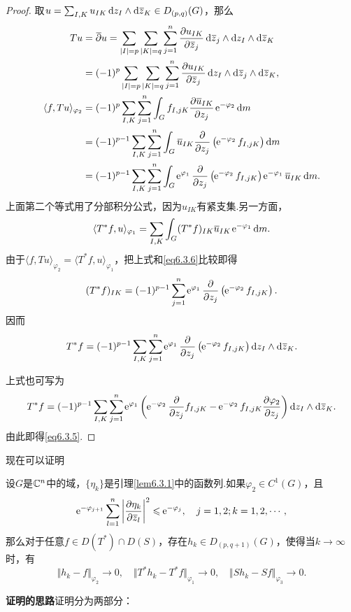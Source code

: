 \begin{proof}
	取$u=\sum_{I,K}u_{IK}\mathop{}\!\mathrm dz_I\wedge\mathop{}\!\mathrm d{}\mkern1mu\overline{\mkern-1muz}_K\in D_{(p,q)}(G)$，那么
	\begin{align}\label{eq6.3.6}
		Tu
		&=\bar{\partial}u=\sum_{|I|=p}\sum_{|K|=q}\sum_{j=1}^{n}\pp{u_{IK}}{\bar{z}_j}\dzz_j\wedge\dz_I\wedge\dzz_K\notag\\
		&=(-1)^p\sum_{|I|=p}\sum_{|K|=q}\sum_{j=1}^{n}\pp{u_{IK}}{\bar{z}_j}\dz_I\wedge\dzz_j\wedge\dzz_K,\notag\\
		\langle f,Tu\rangle_{\varphi_2}
		&=(-1)^p\sum_{I,K}\sum_{j=1}^n \int_G f_{I,jK}\pp{\bar{u}_{IK}}{z_j}\ee^{-\varphi_2}\dif m\notag\\
		&=(-1)^{p-1}\sum_{I,K}\sum_{j=1}^n \int_G\bar{u}_{IK}\pp{}{z_j}\left(\ee^{-\varphi_2}f_{I,jK}\right)\dif m\notag\\
		&=(-1)^{p-1}\sum_{I,K}\sum_{j=1}^n \int_G \ee^{\varphi_1}\pp{}{z_j}\left(\ee^{-\varphi_2}f_{I,jK}\right)\ee^{-\varphi_1}\bar{u}_{IK}\dif m.
	\end{align}
上面第二个等式用了分部积分公式，因为$u_{IK}$有紧支集.另一方面，
\[\langle T^\ast f,u\rangle_{\varphi_1}=\sum_{I,K}\int_G (T^\ast f)_{IK}{}\mkern1mu\overline{\mkern-1muu}_{IK}\operatorname{\!\!\;\mathrm e}^{-\varphi_1}\mathop{}\!\mathrm{d} m.\]
由于$\langle f,Tu\rangle_{\varphi_2}=\langle T^\ast f,u\rangle_{\varphi_1}$，把上式和\eqref{eq6.3.6}比较即得
\[(T^\ast f)_{IK}=(-1)^{p-1}\sum_{j=1}^{n}\operatorname{\!\!\;\mathrm e}^{\varphi_1}\frac{\partial }{\partial z_j}\left(\operatorname{\!\!\;\mathrm e}^{-\varphi_2}f_{I,jK}\right).\]
因而
\[T^\ast f=(-1)^{p-1}\sum_{I,K}\sum_{j=1}^{n}\operatorname{\!\!\;\mathrm e}^{\varphi_1}\frac{\partial }{\partial z_j}\left(\operatorname{\!\!\;\mathrm e}^{-\varphi_2}f_{I,jK}\right)\mathop{}\!\mathrm dz_I\wedge\mathop{}\!\mathrm d{}\mkern1mu\overline{\mkern-1muz}_K.\]

上式也可写为
\[T^\ast f=(-1)^{p-1}\sum_{I,K}\sum_{j=1}^{n}\ee^{\varphi_1}\left(\ee^{-\varphi_2}\pp{}{z_j}f_{I,jK}-\ee^{-\varphi_2}f_{I,jK}\pp{\varphi_2}{z_j}\right)\dz_I\wedge\dzz_K.\]
由此即得\eqref{eq6.3.5}.
\end{proof}
现在可以证明
\begin{prop}\label{prop6.3.4}
	设$G$是$\mathbb C^n$中的域，$\{\eta_k\}$是引理\ref{lem6.3.1}中的函数列.如果$\varphi_2\in C^1(G)$，且
	\begin{equation}\label{eq6.3.7}
		\operatorname{\!\!\;\mathrm e}^{-\varphi_{j+1}}\sum_{l=1}^{n}\left|\frac{\partial \eta_k}{\partial {}\mkern1mu\overline{\mkern-1muz}_l}\right|^2\leqslant\operatorname{\!\!\;\mathrm e}^{-\varphi_j},\quad j=1,2;k=1,2,\cdots,
	\end{equation}
那么对于任意$f\in D(T^\ast)\cap D(S)$，存在$h_k\in D_{(p,q+1)}(G)$，使得当$k\to\infty$时，有
\[\Vert h_k-f\Vert_{\varphi_2}\to0,\quad\Vert T^\ast h_k-T^\ast f\Vert_{\varphi_1}\to0,\quad\Vert Sh_k-Sf\Vert_{\varphi_3}\to0.\]
\end{prop}
\textbf{证明的思路}\quad 证明分为两部分：

